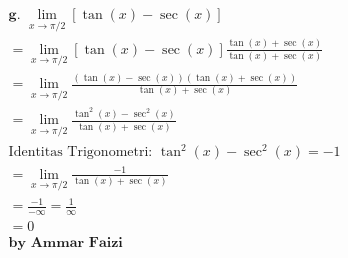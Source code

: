 \documentclass[12pt]{article}
\begin{document}
\begin{fleqn}[1em]
\begin{align*}
\boxed{
\begin{aligned}
  & \textbf{g. } \lim_{x \to \pi/2} \left[\tan(x) - \sec(x)\right] \\
  & = \lim_{x \to \pi/2} \left[\tan(x) - \sec(x)\right] \frac{\tan(x) + \sec(x)}{\tan(x) + \sec(x)} \\
  & = \lim_{x \to \pi/2} \frac{(\tan(x) - \sec(x))(\tan(x) + \sec(x))}{\tan(x) + \sec(x)} \\
  & = \lim_{x \to \pi/2} \frac{\tan ^2\left(x\right)-\sec ^2\left(x\right)}{\tan(x) + \sec(x)} \\
  & \boxed{\text{Identitas Trigonometri: } \tan ^2\left(x\right)-\sec ^2\left(x\right)=-1} \\
  & = \lim_{x \to \pi/2} \frac{-1}{\tan(x) + \sec(x)} \\
  & = \frac{-1}{-\infty} = \frac{1}{\infty}\\
  & = 0
  \\ & \textbf{by Ammar Faizi}
\end{aligned}
}
\end{align*}


\end{fleqn}
\end{document}
